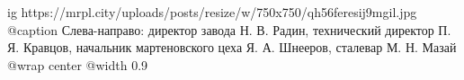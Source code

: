  
 
 
 
 

\ifcmt
  ig https://mrpl.city/uploads/posts/resize/w/750x750/qh56feresij9mgil.jpg
	@caption Слева-направо: директор завода Н. В. Радин, технический директор П. Я. Кравцов, начальник мартеновского цеха Я. А. Шнееров, сталевар М. Н. Мазай
  @wrap center
  @width 0.9
\fi
